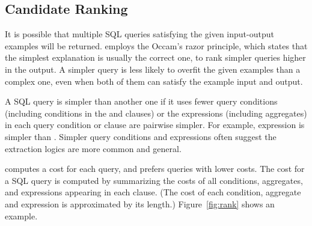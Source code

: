 \subsection{Candidate Ranking}
\label{sec:ranking}

\vspace{-1mm}

It is possible that multiple SQL queries satisfying
the given input-output examples will be returned.
\ourtool employs the Occam's razor principle,
which states that the simplest explanation is
usually the correct one, to rank simpler queries higher in
the output.
A simpler query is less likely to overfit the given examples
than a complex one, even when both of them
can satisfy the example input and output.


A SQL query is simpler than another one if it uses
fewer query conditions (including conditions in the 
and  clauses) or the expressions (including
aggregates) in each query condition or clause are pairwise simpler.
For example, expression  is simpler than
.
Simpler query conditions and expressions often suggest the extraction logics
are more common and general.

\ourtool computes a cost for each
query, and prefers queries with lower costs. The cost
for a SQL query is computed by summarizing
the costs of all conditions, aggregates,
and expressions
appearing in each clause. %
(The cost of each condition, aggregate and expression
is approximated by its length.)
Figure~\ref{fig:rank} shows an example.


